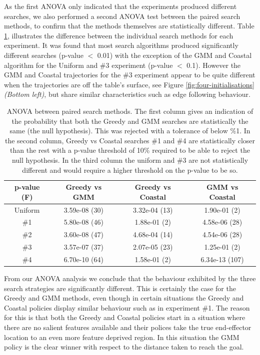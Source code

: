 As the first ANOVA only indicated that the experiments produced different searches,
we also performed a second ANOVA test between the paired search methods, to confirm that the methods themselves are statistically different.
Table \ref{fig:anova-2}, illustrates the difference between the individual search methods for each experiment. 
It was found that most search algorithms produced significantly different searches (p-value $<$ 0.01) with
the exception of the GMM and Coastal algorithm for the Uniform and \#3 experiment (p-value $<$ 0.1). 
However the GMM and Coastal trajectories for the \#3 experiment appear to be quite different when the trajectories 
are off the table's surface, see Figure \ref{fig:four-initialisations} \textit{(Bottom left)}, but share similar 
characteristics such as edge following behaviour.

\begin{table}[h!]
 \centering
 \begin{tabular}{c|c|c|c|}
   p-value (F)   &  Greedy vs GMM      &     Greedy vs Coastal        &  GMM vs Coastal     \\\hline
  Uniform & 3.59e-08 (30)  &   3.32e-04 (13) 		     &  1.90e-01 (2)  \cellcolor{Gray}\\
\#1  	  & 5.80e-08 (46) &  1.88e-01 (2) \cellcolor{Gray} &  4.58e-06 (28)\\
\#2	  & 3.60e-08 (47) &  4.68e-04 (14)		    &  4.54e-06 (28) \\
\#3	  & 3.57e-07 (37) &  2.07e-05 (23)		    &  1.25e-01 (2) \cellcolor{Gray} \\
\#4	  & 6.70e-10 (64) &  1.58e-01 (2) \cellcolor{Gray} &  6.34e-13 (107)
\end{tabular}
\caption{ANOVA between paired search methods. The first column gives an indication of the probability that both the Greedy 
and GMM searches are statistically the same (the null hypothesis). This was rejected with a tolerance of below \%1. 
In the second column, Greedy vs Coastal searches \#1 and \#4 are statistically closer 
than the rest with a p-value threshold of 10\% required to be able to reject the null hypothesis. 
In the third column the uniform and \#3 are not statistically different and would require a higher threshold on the p-value to be so.}
\label{fig:anova-2}
\end{table}

From our ANOVA analysis we conclude that the behaviour exhibited by the three search strategies are 
significantly different. This is certainly the case for the Greedy and GMM methods, even though in 
certain situations the Greedy and Coastal policies display similar behaviour such as in experiment \#1.
The reason for this is that both the Greedy and Coastal policies start in a situation where there are no salient features available
and their polices take the true end-effector location to an even more feature deprived 
region. In this situation the GMM policy is the clear winner with respect to the distance taken to reach
the goal. 

